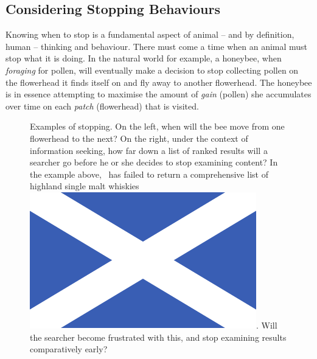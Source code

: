 \subsection{Considering Stopping Behaviours}
Knowing when to stop is a fundamental aspect of animal -- and by definition, human -- thinking and behaviour. There must come a time when an animal must stop what it is doing. In the natural world for example, a honeybee, when \emph{foraging} for pollen, will eventually make a decision to stop collecting pollen on the flowerhead it finds itself on and fly away to another flowerhead. The honeybee is in essence attempting to maximise the amount of \emph{gain} (pollen) she accumulates over time on each \emph{patch} (flowerhead) that is visited.

\begin{figure}[t!]
    \centering
    \caption[Animal and searcher stopping examples]{Examples of stopping. On the left, when will the bee move from one flowerhead to the next? On the right, under the context of information seeking, how far down a list of ranked results will a searcher go before he or she decides to stop examining content? In the example above, \searchlogo~has failed to return a comprehensive list of highland single malt whiskies~\includegraphics[height=\fontcharht\font`\d]{figures/ch0-saltire.pdf}. Will the searcher become frustrated with this, and stop examining results comparatively early?}
    \label{fig:ch1-stopping}
\end{figure}

